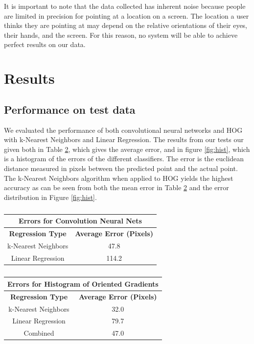 \documentclass[10pt,twocolumn,letterpaper]{article}
\begin{document}
It is important to note that the data collected has inherent noise because people are limited in precision for pointing at a location on a screen.  The location a user thinks they are pointing at may depend on the relative orientations of their eyes, their hands, and the screen.  For this reason, no system will be able to achieve perfect results on our data.

\pagebreak
\section{Results}

\subsection{Performance on test data}
We evaluated the performance of both convolutional neural networks and HOG with k-Nearest Neighbors and Linear Regression. The results from our tests our given both in Table \ref{table:meanErrors}, which gives the average error, and in figure \ref{fig:hist}, which is a histogram of the errors of the different classifiers. The error is the euclidean distance measured in pixels between the predicted point and the actual point.
The k-Nearest Neighbors algorithm when applied to HOG yields the highest accuracy as can be seen from both the mean error in Table \ref{table:meanErrors} and the error distribution in Figure \ref{fig:hist}.

\begin{table}
	\caption{}
	\begin{center}
		\begin{tabular}{|c|c|}
			\hline
			\multicolumn{2}{|c|}{\textbf{Errors for Convolution Neural Nets}}\\\hline
			\textbf{Regression Type} & \textbf{Average Error (Pixels)} \\\hline
			k-Nearest Neighbors & 47.8 \\\hline
			Linear Regression &  114.2 \\\hline	
		\end{tabular}
		\begin{tabular}{|c|c|}
			\hline
			\multicolumn{2}{|c|}{\textbf{Errors for Histogram of Oriented Gradients}} \\\hline
			\textbf{Regression Type} & \textbf{Average Error (Pixels)} \\\hline
			k-Nearest Neighbors & 32.0\\\hline
			Linear Regression & 79.7 \\\hline
			Combined & 47.0 \\\hline
		\end{tabular}
	\end{center}
	\label{table:meanErrors}
\end{table}
 
\end{document}
